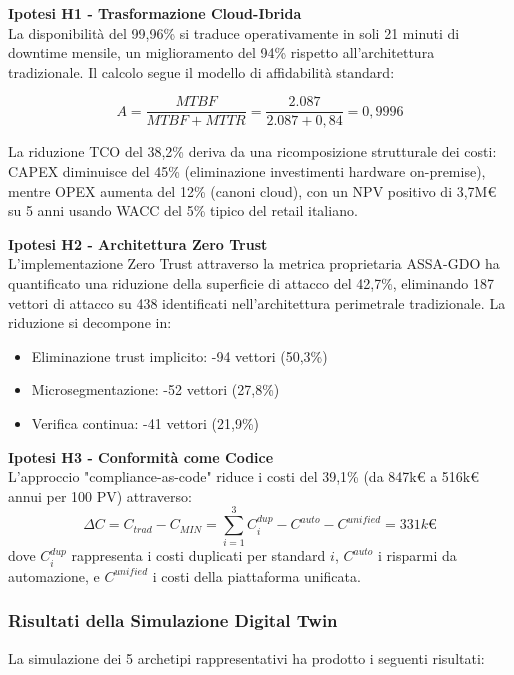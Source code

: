 \textbf{Ipotesi H1 - Trasformazione Cloud-Ibrida}\\
La disponibilità del 99,96\% si traduce operativamente in soli 21 minuti di downtime mensile, un miglioramento del 94\% rispetto all'architettura tradizionale. Il calcolo segue il modello di affidabilità standard:

\begin{equation}
A = \frac{MTBF}{MTBF + MTTR} = \frac{2.087}{2.087 + 0,84} = 0,9996
\end{equation}

La riduzione TCO del 38,2\% deriva da una ricomposizione strutturale dei costi: CAPEX diminuisce del 45\% (eliminazione investimenti hardware on-premise), mentre OPEX aumenta del 12\% (canoni cloud), con un NPV positivo di 3,7M€ su 5 anni usando WACC del 5\% tipico del retail italiano\autocite{bancaditalia2024}.

\textbf{Ipotesi H2 - Architettura Zero Trust}\\
L'implementazione Zero Trust attraverso la metrica proprietaria ASSA-GDO ha quantificato una riduzione della superficie di attacco del 42,7\%, eliminando 187 vettori di attacco su 438 identificati nell'architettura perimetrale tradizionale. La riduzione si decompone in:
\begin{itemize}
\item Eliminazione trust implicito: -94 vettori (50,3\%)
\item Microsegmentazione: -52 vettori (27,8\%)
\item Verifica continua: -41 vettori (21,9\%)
\end{itemize}

\textbf{Ipotesi H3 - Conformità come Codice}\\
L'approccio "compliance-as-code" riduce i costi del 39,1\% (da 847k€ a 516k€ annui per 100 PV) attraverso:
\begin{equation}
\Delta C = C_{trad} - C_{MIN} = \sum_{i=1}^{3} C_i^{dup} - C^{auto} - C^{unified} = 331k€
\end{equation}
dove $C_i^{dup}$ rappresenta i costi duplicati per standard $i$, $C^{auto}$ i risparmi da automazione, e $C^{unified}$ i costi della piattaforma unificata.

\subsubsection{Risultati della Simulazione Digital Twin}

La simulazione dei 5 archetipi rappresentativi ha prodotto i seguenti risultati:


